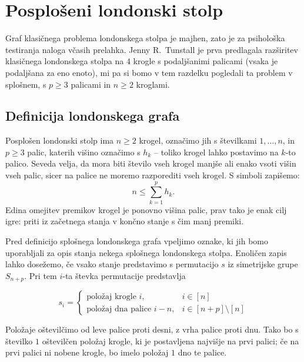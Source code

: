 \documentclass[12pt,a4paper]{amsart}
\theoremstyle{definition} %
\theoremstyle{plain} %
\begin{document}
\section{Posplošeni londonski stolp}
Graf klasičnega problema londonskega stolpa je majhen, zato je za psihološka testiranja naloga včasih prelahka. 
Jenny R.\ Tunstall je prva predlagala razširitev klasičnega londonskega stolpa na 4 krogle s podaljšanimi palicami (vsaka je podaljšana za eno enoto), mi pa si bomo v tem razdelku pogledali ta problem v splošnem, s $p \geq 3$ palicami in $n \geq 2$ kroglami.

\subsection{Definicija londonskega grafa}

Posplošen londonski stolp ima $n \geq 2$ krogel, označimo jih s številkami $1,\ldots,n$, in $p \geq 3$ palic, katerih višino označimo s $h_k$ -- toliko krogel lahko postavimo na $k$-to palico. Seveda velja, da mora biti število vseh krogel manjše ali enako vsoti višin vseh palic, sicer na palice ne moremo razporediti vseh krogel. S simboli zapišemo:
\[ n \leq \sum_{k=1}^{p} h_k.\]
Edina omejitev premikov krogel je ponovno višina palic, prav tako je enak cilj igre: priti iz začetnega stanja v končno stanje s čim manj premiki.

Pred definicijo splošnega londonskega grafa vpeljimo oznake, ki jih bomo uporabljali za opis stanja nekega splošnega londonskega stolpa. Enoličen zapis lahko dosežemo, če vsako stanje predstavimo s permutacijo $s$ iz simetrijske grupe $S_{n+p}$. Pri tem $i$-ta števka permutacije predstavlja

\[ s_i =
\begin{cases}
    \text{položaj krogle } i, & i \in [n] \\
    \text{položaj dna palice } i-n, & i \in [n+p] \setminus [n]
\end{cases}
\]

Položaje oštevilčimo od leve palice proti desni, z vrha palice proti dnu. Tako bo s številko $1$ oštevilčen položaj krogle, ki je postavljena najvišje na prvi palici; če na prvi palici ni nobene krogle, bo imelo položaj $1$ dno te palice.
\end{document}

